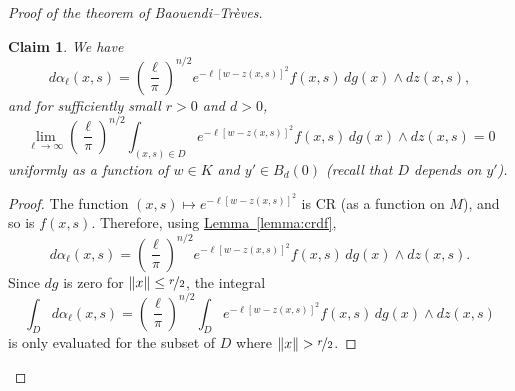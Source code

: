 \documentclass[12pt,openany]{book}
\newcommand{\snorm}[1]{\lVert {#1} \rVert}
\theoremstyle{plain}
\newtheorem{claim}[thm]{Claim}
\theoremstyle{remark}
\theoremstyle{definition}
\theoremstyle{exercise}
\theoremstyle{example}
\newcommand{\lemmaref}[1]{\hyperref[#1]{Lemma~\ref*{#1}}}
\begin{document}
\begin{proof}[Proof of the theorem of Baouendi--Tr{\`e}ves]
\begin{claim}
\pagebreak[2]
We have
\begin{equation*}
d \alpha_\ell(x,s)
=
{\left(\frac{\ell}{\pi}\right)}^{n/2}
e^{-\ell [w - z(x,s)]^2} f(x,s)
\,
dg(x)
\wedge
dz(x,s) ,
\end{equation*}
and for sufficiently small $r>0$ and $d>0$,
\begin{equation*}
\lim_{\ell\to\infty}
{\left(\frac{\ell}{\pi}\right)}^{n/2}
\int_{(x,s)\in D}
e^{-\ell [w - z(x,s)]^2} f(x,s)
\,
dg(x)
\wedge
dz(x,s)
= 0
\end{equation*}
uniformly as a function of $w \in K$ and $y' \in B_d(0)$ (recall that $D$ depends on
$y'$).
\end{claim}

\begin{proof}
The function
$(x,s) \mapsto e^{-\ell [w - z(x,s)]^2}$ is CR (as a function on $M$), and so
is $f(x,s)$.  Therefore, using \lemmaref{lemma:crdf},
\begin{equation*}
d \alpha_{\ell}(x,s)
=
{\left(\frac{\ell}{\pi}\right)}^{n/2}
e^{-\ell [w - z(x,s)]^2 } f(x,s)
\,
dg(x)
\wedge
dz(x,s) .
\end{equation*}
Since $dg$ is zero for $\snorm{x} \leq \nicefrac{r}{2}$, the integral
\begin{equation*}
\int_D
d \alpha_\ell(x,s)
=
{\left(\frac{\ell}{\pi}\right)}^{n/2}
\int_D
e^{ -\ell [w - z(x,s)]^2} f(x,s)
\,
dg(x)
\wedge
dz(x,s)
\end{equation*}
is only evaluated for the subset of $D$ where $\snorm{x} > \nicefrac{r}{2}$.


\end{proof}
\end{proof}
\end{document}
